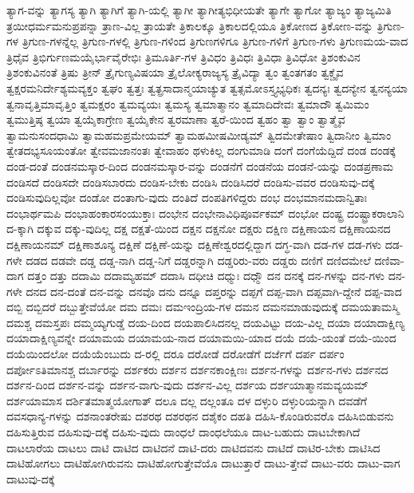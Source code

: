{ತ್ಯಾಗ-ವನ್ನು
ತ್ಯಾಗಸ್ಯ
ತ್ಯಾಗಿ
ತ್ಯಾಗಿಗೆ
ತ್ಯಾಗಿ-ಯಲ್ಲಿ
ತ್ಯಾಗೀ
ತ್ಯಾಗೀತ್ಯಭಿಧೀಯತೇ
ತ್ಯಾಗೇ
ತ್ಯಾಗೋ
ತ್ಯಾಜ್ಯಂ
ತ್ಯಾಜ್ಯಮಿತಿ
ತ್ರಯೀಧರ್ಮಮನುಪ್ರಪನ್ನಾ
ತ್ರಾಣ-ವಿಲ್ಲ
ತ್ರಾಯತೇ
ತ್ರಿಕಾಲಕ್ಕೂ
ತ್ರಿಕಾಲದಲ್ಲಿಯೂ
ತ್ರಿಕೋಣದ
ತ್ರಿಕೋಣ-ವನ್ನು
ತ್ರಿಗುಣ-ಗಳ
ತ್ರಿಗುಣ-ಗಳನ್ನೆಲ್ಲ
ತ್ರಿಗುಣ-ಗಳಲ್ಲಿ
ತ್ರಿಗುಣ-ಗಳಿಂದ
ತ್ರಿಗುಣಗಳಿಗೂ
ತ್ರಿಗುಣ-ಗಳಿಗೆ
ತ್ರಿಗುಣ-ಗಳು
ತ್ರಿಗುಣಮಯ-ವಾದ
ತ್ರಿಧೈವ
ತ್ರಿಭಿರ್ಗುಣಮಯೈರ್ಭಾವೈರೇಭಿಃ
ತ್ರಿಮೂರ್ತಿ-ಗಳ
ತ್ರಿವಿಧಂ
ತ್ರಿವಿಧಃ
ತ್ರಿವಿಧಾ
ತ್ರಿವಿಧೋ
ತ್ರಿಶಂಕುವಿನ
ತ್ರಿಶಂಕುವಿನಂತೆ
ತ್ರಿಷು
ತ್ರೀನ್
ತ್ರೈಗುಣ್ಯವಿಷಯಾ
ತ್ರೈಲೋಕ್ಯರಾಜ್ಯಸ್ಯ
ತ್ರೈವಿದ್ಯಾ
ತ್ವಂ
ತ್ವಂತಗತಂ
ತ್ವಕ್ಚೈವ
ತ್ವಕ್ಷರಮನಿರ್ದೇಶ್ಯಮವ್ಯಕ್ತಂ
ತ್ವಘಂ
ತ್ವತ್ತಃ
ತ್ವತ್ಪ್ರಸಾದಾನ್ಮಯಾಚ್ಯುತ
ತ್ವತ್ಸಮೋಽಸ್ತ್ಯಭ್ಯಧಿಕಃ
ತ್ವದನ್ಯಃ
ತ್ವದನ್ಯೇನ
ತ್ವನನ್ಯಯಾ
ತ್ವನಾವೃತ್ತಿಮಾವೃತ್ತಿಂ
ತ್ವಮಕ್ಷರಂ
ತ್ವಮವ್ಯಯಃ
ತ್ವಮಸ್ಯ
ತ್ವಮಾತ್ಮಾನಂ
ತ್ವಮಾದಿದೇವಃ
ತ್ವಮಾದೌ
ತ್ವಮಿಮಂ
ತ್ವಮುತ್ತಿಷ್ಠ
ತ್ವಯಾ
ತ್ವಯೈಕಾಗ್ರೇಣ
ತ್ವಯೈಕೇನ
ತ್ವರಮಾಣಾ
ತ್ವರೆ-ಯಿಂದ
ತ್ವಹಂ
ತ್ವಾ
ತ್ವಾಂ
ತ್ವಾತ್ಮೈವ
ತ್ವಾಮನುಸಂದಧಾಮಿ
ತ್ವಾಮಹಮಪ್ರಮೇಯಮ್
ತ್ವಾಮಹಮೀಷಮೀಡ್ಯಮ್
ತ್ವಿದಮೇತೇಷಾಂ
ತ್ವಿದಾನೀಂ
ತ್ವಿಮಾಂ
ತ್ವೇತದಭ್ಯಸೂಯಂತೋ
ತ್ವೇವಮಜಾನಂತಃ
ತ್ವೇವಾಹಂ
ಥಳುಕಿಲ್ಲ
ದಂಗುಮಾಡಿ
ದಂಗೆ
ದಂಗೆಯೆದ್ದಿದೆ
ದಂಡ
ದಂಡಕ್ಕೆ
ದಂಡ-ದಂತೆ
ದಂಡನಮಸ್ಕಾರ-ದಿಂದ
ದಂಡನಮಸ್ಕಾರ-ವನ್ನು
ದಂಡನೆಗೆ
ದಂಡನೆಯ
ದಂಡನೆ-ಯನ್ನು
ದಂಡಪ್ರಣಾಮ
ದಂಡಿಸದೆ
ದಂಡಿಸದೇ
ದಂಡಿಸಬಾರದು
ದಂಡಿಸ-ಬೇಕು
ದಂಡಿಸಿ
ದಂಡಿಸಿದರೆ
ದಂಡಿಸು-ವವರ
ದಂಡಿಸುವು-ದಕ್ಕೆ
ದಂಡಿಸುವುದಿಲ್ಲವೋ
ದಂಡೋ
ದಂತಾಗು-ವುದು
ದಂತಿದೆ
ದಂಪತಿಗಳಿದ್ದರು
ದಂಭ
ದಂಭಮಾನಮದಾನ್ವಿತಾಃ
ದಂಭಾರ್ಥಮಪಿ
ದಂಭಾಹಂಕಾರಸಂಯುಕ್ತಾಃ
ದಂಭೇನ
ದಂಭೇನಾವಿಧಿಪೂರ್ವಕಮ್
ದಂಭೋ
ದಂಷ್ಟ್ರ
ದಂಷ್ಟ್ರಾಕರಾಲಾನಿ
ದ-ಕ್ಕಾಗಿ
ದಕ್ಕುವ
ದಕ್ಕು-ವುದಿಲ್ಲ
ದಕ್ಷ
ದಕ್ಷತೆ-ಯಿಂದ
ದಕ್ಷನ
ದಕ್ಷನೋ
ದಕ್ಷರು
ದಕ್ಷಿಣ
ದಕ್ಷಿಣಾಯನ
ದಕ್ಷಿಣಾಯನದ
ದಕ್ಷಿಣಾಯನಮ್
ದಕ್ಷಿಣಾಶೂನ್ಯ
ದಕ್ಷಿಣೆ
ದಕ್ಷಿಣೆ-ಯನ್ನು
ದಕ್ಷಿಣೇಶ್ವರದಲ್ಲಿದ್ದಾಗ
ದಗ್ಧ-ವಾಗಿ
ದಡ-ಗಳ
ದಡ-ಗಳು
ದಡ-ಗಳೇ
ದಡದ
ದಡವೇ
ದಡ್ಡ
ದಡ್ಡ-ನಾಗಿ
ದಡ್ಡ-ನಿಗೆ
ದಡ್ಡರನ್ನಾಗಿ
ದಡ್ಡರಿರು-ವರು
ದಡ್ಡರು
ದಣಿಗೆ
ದಣಿದಮೇಲೆ
ದಣಿವಾ-ದಾಗ
ದತ್ತಂ
ದತ್ತು
ದದಾಮಿ
ದದಾಮ್ಯಹಮ್
ದದಾಸಿ
ದಧೀಚಿ
ದಧ್ಮುಃ
ದಧ್ಮೌ
ದನ
ದನಕ್ಕೆ
ದನ-ಗಳನ್ನು
ದನ-ಗಳು
ದನ-ಗಳೇ
ದನದ
ದನ-ದಂತೆ
ದನ-ವನ್ನು
ದನವೊ
ದನು
ದನ್ನೂ
ದಪ್ತರನ್ನು
ದಪ್ಪಗೆ
ದಪ್ಪ-ವಾಗಿ
ದಪ್ಪವಾಗಿ-ದ್ದೇನೆ
ದಪ್ಪ-ವಾದ
ದಬ್ಬಿ
ದಬ್ಬಿದರೆ
ದಬ್ಬುತ್ತೇವೆಯೋ
ದಮ
ದಮಃ
ದಮಇಂದ್ರಿಯ-ಗಳ
ದಮನ
ದಮನಮಾಡುವುದುಕ್ಕೆ
ದಮಯತಾಮಸ್ಮಿ
ದಮಶ್ಚ
ದಮಸ್ತಪಃ
ದಮ್ಮಯ್ಯಗುಡ್ಡೆ
ದಯ-ದಿಂದ
ದಯಪಾಲಿಸಿದನಲ್ಲ
ದಯವಿಟ್ಟು
ದಯ-ವಿಲ್ಲ
ದಯಾ
ದಯಾದಾಕ್ಷಿಣ್ಯ
ದಯಾದಾಕ್ಷಿಣ್ಯವನ್ನೇ
ದಯಾಮಯ
ದಯಾಮಯ-ನಾದ
ದಯಾಮಯಿ-ಯಾದ
ದಯೆ
ದಯೆ-ಯಂತೆ
ದಯೆ-ಯಿಂದ
ದಯೆಯಿಂದಲೋ
ದಯೆಯೆಂಬುದು
ದ-ರಲ್ಲಿ
ದರೂ
ದರೋಡೆ
ದರೋಡೆಗೆ
ದರ್ಜೆಗೆ
ದರ್ಪ
ದರ್ಪಂ
ದರ್ಪೋಽತಿಮಾನಶ್ಚ
ದರ್ಬಾರನ್ನು
ದರ್ಶಕರು
ದರ್ಶನ
ದರ್ಶನಕಾಂಕ್ಷಿಣಃ
ದರ್ಶನ-ಗಳನ್ನು
ದರ್ಶನ-ಗಳು
ದರ್ಶನದ
ದರ್ಶನ-ದಿಂದ
ದರ್ಶನ-ವನ್ನು
ದರ್ಶನ-ವಾಗು-ವುದು
ದರ್ಶನ-ವಿಲ್ಲ
ದರ್ಶಯ
ದರ್ಶಯಾತ್ಮಾನಮವ್ಯಯಮ್
ದರ್ಶಯಾಮಾಸ
ದರ್ಶಿತಮಾತ್ಮಯೋಗಾತ್
ದಲೂ
ದಲ್ಲ
ದಲ್ಲಂತೂ
ದಳ
ದಳ್ಳುರಿ
ದಳ್ಳುರಿಯನ್ನಾಗಿ
ದವಡೆಗೆ
ದವಸಧಾನ್ಯ-ಗಳನ್ನು
ದಶನಾಂತರೇಷು
ದಶರಥ
ದಶರಥನ
ದಶೈಕಂ
ದಹತಿ
ದಹಿಸಿ-ಕೊಂಡಿರುವರೊ
ದಹಿಸಿಬಿಡುವನು
ದಹಿಸುತ್ತಿರುವ
ದಹಿಸುವು-ದಕ್ಕೆ
ದಹಿಸು-ವುದು
ದಾಂಧಲೆ
ದಾಂಧಲೆಯೂ
ದಾಟ-ಬಹುದು
ದಾಟಬೇಕಾಗಿದೆ
ದಾಟಲಾರೆಯ
ದಾಟಲು
ದಾಟಿ
ದಾಟಿದ
ದಾಟಿದನೆ
ದಾಟಿ-ದರು
ದಾಟಿದವನು
ದಾಟಿದೆ
ದಾಟಿರ-ಬೇಕು
ದಾಟಿಸಿದ
ದಾಟಿಹೋಗಲು
ದಾಟಿಹೋಗಿರುವನು
ದಾಟಿಹೋಗುತ್ತೇವೆಯೊ
ದಾಟುತ್ತಾರೆ
ದಾಟು-ತ್ತೇವೆ
ದಾಟು-ವರು
ದಾಟು-ವಾಗ
ದಾಟುವು-ದಕ್ಕೆ
}
